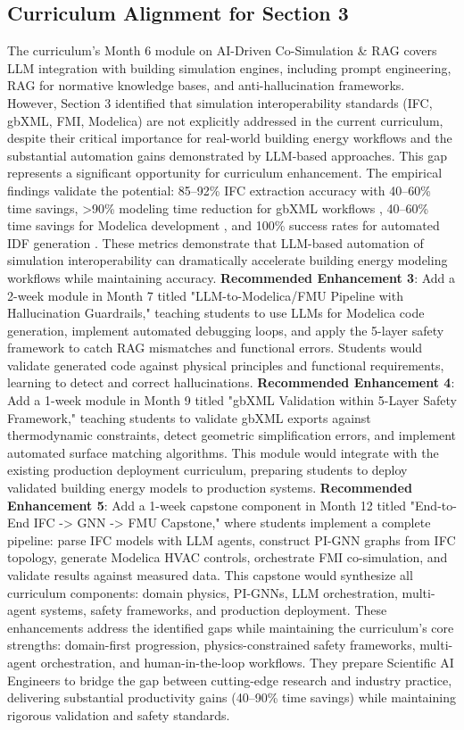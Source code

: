 \documentclass[12pt,a4paper]{article}
\begin{document}
\subsection{Curriculum Alignment for Section 3}
The curriculum's Month 6 module on AI-Driven Co-Simulation \& RAG covers LLM integration with building simulation engines, including prompt engineering, RAG for normative knowledge bases, and anti-hallucination frameworks. However, Section 3 identified that simulation interoperability standards (IFC, gbXML, FMI, Modelica) are not explicitly addressed in the current curriculum, despite their critical importance for real-world building energy workflows and the substantial automation gains demonstrated by LLM-based approaches.
This gap represents a significant opportunity for curriculum enhancement. The empirical findings validate the potential: 85--92\% IFC extraction accuracy with 40--60\% time savings, >90\% modeling time reduction for gbXML workflows \cite{ref36}, 40--60\% time savings for Modelica development \cite{ref61}, and 100\% success rates for automated IDF generation \cite{ref123}. These metrics demonstrate that LLM-based automation of simulation interoperability can dramatically accelerate building energy modeling workflows while maintaining accuracy.
\textbf{Recommended Enhancement 3}: Add a 2-week module in Month 7 titled "LLM-to-Modelica/FMU Pipeline with Hallucination Guardrails," teaching students to use LLMs for Modelica code generation, implement automated debugging loops, and apply the 5-layer safety framework to catch RAG mismatches and functional errors. Students would validate generated code against physical principles and functional requirements, learning to detect and correct hallucinations.
\textbf{Recommended Enhancement 4}: Add a 1-week module in Month 9 titled "gbXML Validation within 5-Layer Safety Framework," teaching students to validate gbXML exports against thermodynamic constraints, detect geometric simplification errors, and implement automated surface matching algorithms. This module would integrate with the existing production deployment curriculum, preparing students to deploy validated building energy models to production systems.
\textbf{Recommended Enhancement 5}: Add a 1-week capstone component in Month 12 titled "End-to-End IFC -> GNN -> FMU Capstone," where students implement a complete pipeline: parse IFC models with LLM agents, construct PI-GNN graphs from IFC topology, generate Modelica HVAC controls, orchestrate FMI co-simulation, and validate results against measured data. This capstone would synthesize all curriculum components: domain physics, PI-GNNs, LLM orchestration, multi-agent systems, safety frameworks, and production deployment.
These enhancements address the identified gaps while maintaining the curriculum's core strengths: domain-first progression, physics-constrained safety frameworks, multi-agent orchestration, and human-in-the-loop workflows. They prepare Scientific AI Engineers to bridge the gap between cutting-edge research and industry practice, delivering substantial productivity gains (40--90\% time savings) while maintaining rigorous validation and safety standards.
\end{document}
